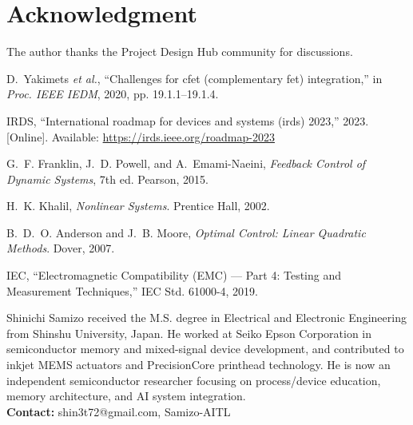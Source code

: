 \documentclass[conference]{IEEEtran}
\begin{document}
\section*{Acknowledgment}
The author thanks the Project Design Hub community for discussions.


\begin{thebibliography}{1}

D.~Yakimets \textit{et al.}, ``Challenges for cfet (complementary fet) integration,'' 
in \textit{Proc. IEEE IEDM}, 2020, pp. 19.1.1--19.1.4.

IRDS, ``International roadmap for devices and systems (irds) 2023,'' 2023. [Online]. Available: \url{https://irds.ieee.org/roadmap-2023}

G.~F. Franklin, J.~D. Powell, and A.~Emami-Naeini, \textit{Feedback Control of Dynamic Systems}, 7th ed. Pearson, 2015.

H.~K. Khalil, \textit{Nonlinear Systems}. Prentice Hall, 2002.

B.~D.~O. Anderson and J.~B. Moore, \textit{Optimal Control: Linear Quadratic Methods}. Dover, 2007.

IEC, ``Electromagnetic Compatibility (EMC) --- Part 4: Testing and Measurement Techniques,'' IEC Std. 61000-4, 2019.

\end{thebibliography}

\begin{IEEEbiography}{Shinichi Samizo}
received the M.S. degree in Electrical and Electronic Engineering from Shinshu University, Japan. He worked at Seiko Epson Corporation in semiconductor memory and mixed-signal device development, and contributed to inkjet MEMS actuators and PrecisionCore printhead technology. He is now an independent semiconductor researcher focusing on process/device education, memory architecture, and AI system integration. \\
\textbf{Contact:} shin3t72@gmail.com, Samizo-AITL
\end{IEEEbiography}
\end{document}
